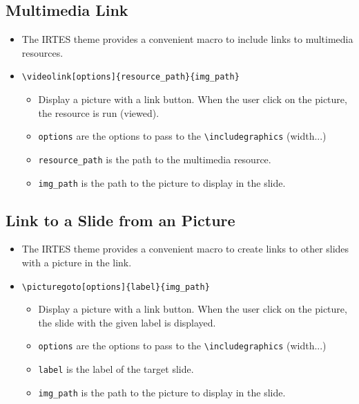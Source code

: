 \documentclass[english,circlenumberstyle]{irtesbeamer}
\begin{document}
\subsection{Multimedia Link}
\begin{frame}{\subsecname}
	\begin{itemize}
	\item The IRTES theme provides a convenient macro to include links to multimedia resources.
	\item \texttt{{\textbackslash}videolink[options]\{resource\_path\}\{img\_path\}}
		\begin{itemize}
		\item Display a picture with a link button. When the user click on the picture, the resource is run (viewed).
		\item \texttt{options} are the options to pass to the \texttt{{\textbackslash}includegraphics} (width...)
		\item \texttt{resource\_path} is the path to the multimedia resource.
		\item \texttt{img\_path} is the path to the picture to display in the slide.
		\end{itemize}
	\end{itemize}
	\begin{center}
	\end{center}
\end{frame}


\subsection{Link to a Slide from an Picture}
\begin{frame}{\subsecname}
	\begin{itemize}
	\item The IRTES theme provides a convenient macro to create links to other slides with a picture in the link.
	\item \texttt{{\textbackslash}picturegoto[options]\{label\}\{img\_path\}}
		\begin{itemize}
		\item Display a picture with a link button. When the user click on the picture, the slide with the given label is displayed.
		\item \texttt{options} are the options to pass to the \texttt{{\textbackslash}includegraphics} (width...)
		\item \texttt{label} is the label of the target slide.
		\item \texttt{img\_path} is the path to the picture to display in the slide.
		\end{itemize}
	\end{itemize}
	\begin{center}
	\end{center}
\end{frame}
\end{document}
